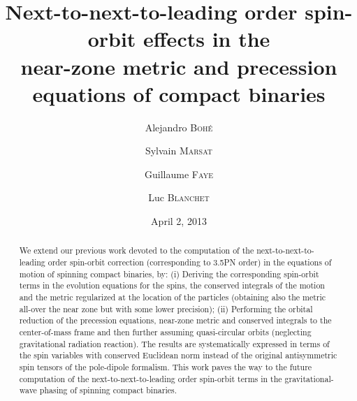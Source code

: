 \documentclass[
superscriptaddress,
preprint,
prd,tightenlines,showpacs,nofootinbib,
eqsecnum,
amsfonts,amsmath,amssymb]{revtex4-1}
\begin{document}
\title{Next-to-next-to-leading order spin-orbit effects in the \\near-zone
  metric and precession equations of compact binaries}

\author{Alejandro \textsc{Boh\'{e}}}

\author{Sylvain \textsc{Marsat}}

\author{Guillaume \textsc{Faye}}

\author{Luc \textsc{Blanchet}}

\date{April 2, 2013}%

\begin{abstract}
  We extend our previous work devoted to the computation of the
  next-to-next-to-leading order spin-orbit correction (corresponding
  to 3.5PN order) in the equations of motion of spinning compact
  binaries, by: (i) Deriving the corresponding spin-orbit terms in the
  evolution equations for the spins, the conserved integrals of the
  motion and the metric regularized at the location of the particles
  (obtaining also the metric all-over the near zone but with some
    lower precision); (ii) Performing the orbital reduction of the
  precession equations, near-zone metric and conserved integrals to
  the center-of-mass frame and then further assuming quasi-circular
  orbits (neglecting gravitational radiation reaction). The results
  are systematically expressed in terms of the spin variables with
  conserved Euclidean norm instead of the original antisymmetric spin
  tensors of the pole-dipole formalism. This work paves the way to the
  future computation of the next-to-next-to-leading order spin-orbit
  terms in the gravitational-wave phasing of spinning compact
  binaries.
\end{abstract}
\end{document}
